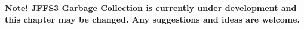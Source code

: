 %
%
%
%

\textbf{Note! JFFS3 Garbage Collection is currently under development and this
chapter may be changed. Any suggestions and ideas are welcome.}



